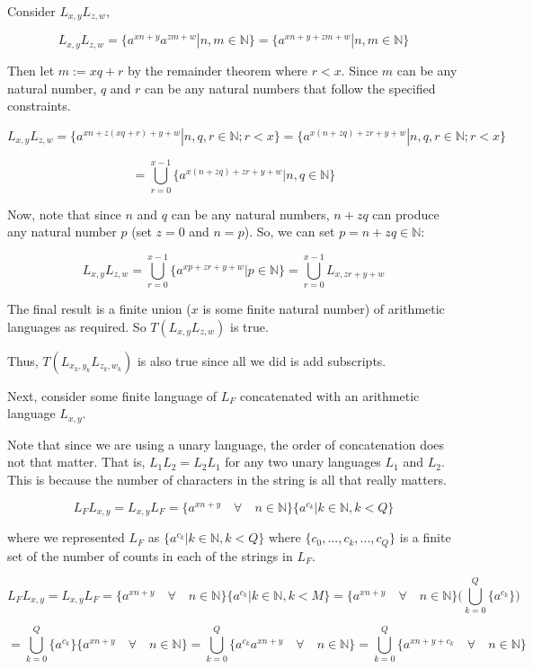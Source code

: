 \documentclass[11pt]{article}
\begin{document}
\begin{enumerate}
    Consider $L_{x,y}L_{z,w}$,

    $$L_{x,y}L_{z,w} = \{a^{xn + y}a^{zm + w} | n, m \in \mathbb{N}\} = \{a^{xn + y + zm + w} | n, m \in \mathbb{N}\}$$

    Then let $m := xq + r$ by the remainder theorem where $r < x$. Since $m$ can be any natural number, $q$ and $r$ can be any natural numbers that follow the specified constraints.

    $$L_{x,y}L_{z,w} = \{a^{xn + z(xq + r) + y + w} | n, q, r \in \mathbb{N}; r < x\} = \{a^{x(n + zq) + zr + y + w} | n, q, r \in \mathbb{N}; r < x\}$$

    $$ = \bigcup_{r=0}^{x-1} \{a^{x(n + zq) + zr + y + w} | n, q \in \mathbb{N}\}$$

    Now, note that since $n$ and $q$ can be any natural numbers, $n + zq$ can produce any natural number $p$ (set $z=0$ and $n=p$). So, we can set $p = n+zq \in \mathbb{N}$:

    $$L_{x,y}L_{z,w} = \bigcup_{r=0}^{x-1} \{a^{xp + zr + y + w} | p \in \mathbb{N}\} = \bigcup_{r=0}^{x-1} L_{x, zr+y+w}$$

    The final result is a finite union ($x$ is some finite natural number) of arithmetic languages as required. So $T(L_{x,y}L_{z,w})$ is true.

    Thus, $T(L_{x_k,y_k}L_{z_k, w_k})$ is also true since all we did is add subscripts.

    Next, consider some finite language of $L_F$ concatenated with an arithmetic language $L_{x,y}$. 
    
    Note that since we are using a unary language, the order of concatenation does not that matter. That is, $L_1 L_2 = L_2 L_1$ for any two unary languages $L_1$ and $L_2$. This is because the number of characters in the string is all that really matters.

    $$L_F L_{x, y} = L_{x, y} L_F = \{a^{xn + y} \quad \forall \quad n \in \mathbb{N}\} \{ a^{c_k} | k \in \mathbb{N}, k < Q \}$$

    where we represented $L_F$ as $\{ a^{c_k} | k \in \mathbb{N}, k < Q \}$ where $\{c_0, ..., c_k, ..., c_Q\}$ is a finite set of the number of counts in each of the strings in $L_F$.

    $$L_F L_{x, y} = L_{x, y} L_F = \{a^{xn + y} \quad \forall \quad n \in \mathbb{N}\} \{ a^{c_k} | k \in \mathbb{N}, k < M \} = \{a^{xn + y} \quad \forall \quad n \in \mathbb{N}\} \big( \bigcup_{k=0}^Q \{ a^{c_k} \}\big)$$

    $$ = \bigcup_{k=0}^Q \{ a^{c_k} \} \{a^{xn + y} \quad \forall \quad n \in \mathbb{N}\} = \bigcup_{k=0}^Q  \{a^{c_k}a^{xn + y} \quad \forall \quad n \in \mathbb{N}\} = \bigcup_{k=0}^Q  \{a^{xn + y + c_k} \quad \forall \quad n \in \mathbb{N}\} $$
    

\end{enumerate}
\end{document}
